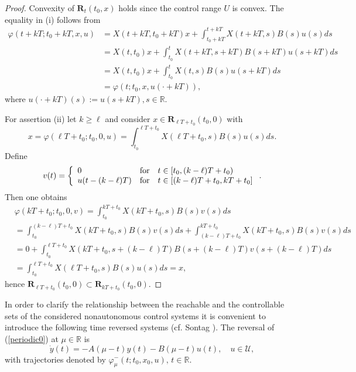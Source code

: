 \documentclass{siamltex}%
\begin{document}
\begin{proof}
Convexity of $\mathbf{R}_{t}(t_{0},x)$ holds since the control range $U$ is
convex. The equality in (i) follows from
\begin{align*}
\varphi(t+kT;t_{0}+kT,x,u)  &  =X(t+kT,t_{0}+kT)x+\int_{t_{0}+kT}%
^{t+kT}X(t+kT,s)B(s)u(s)ds\\
&  =X(t,t_{0})x+\int_{t_{0}}^{t}X(t+kT,s+kT)B(s+kT)u(s+kT)ds\\
&  =X(t,t_{0})x+\int_{t_{0}}^{t}X(t,s)B(s)u(s+kT)ds\\
&  =\varphi(t;t_{0},x,u(\cdot+kT)),
\end{align*}
where $u(\cdot+kT)(s):=u(s+kT),s\in\mathbb{R}$.

For assertion (ii) let $k\geq\ell$ and consider $x\in\mathbf{R}_{\ell T+t_{0}%
}(t_{0},0)$ with%
\[
x=\varphi(\ell T+t_{0};t_{0},0,u)=\int_{t_{0}}^{\ell T+t_{0}}X(\ell
T+t_{0},s)B(s)u(s)ds.
\]
Define
\[
v(t)=\left\{
\begin{array}
[c]{lll}%
0 & \text{for} & t\in\lbrack t_{0},(k-\ell)T+t_{0})\\
u(t-(k-\ell)T) & \text{for} & t\in\lbrack(k-\ell)T+t_{0},kT+t_{0}]
\end{array}
\right.  .
\]
Then one obtains
\begin{align*}
&  \varphi(kT+t_{0};t_{0},0,v)=\int_{t_{0}}^{kT+t_{0}}X(kT+t_{0}%
,s)B(s)v(s)ds\\
&  =\int_{t_{0}}^{(k-\ell)T+t_{0}}X(kT+t_{0},s)B(s)v(s)ds+\int_{(k-\ell
)T+t_{0}}^{kT+t_{0}}X(kT+t_{0},s)B(s)v(s)ds\\
&  =0+\int_{t_{0}}^{\ell T+t_{0}}X(kT+t_{0},s+(k-\ell)T)B(s+(k-\ell
)T)v(s+(k-\ell)T)ds\\
&  =\int_{t_{0}}^{\ell T+t_{0}}X(\ell T+t_{0},s)B(s)u(s)ds=x,
\end{align*}
hence $\mathbf{R}_{\ell T+t_{0}}(t_{0},0)\subset\mathbf{R}_{kT+t_{0}}%
(t_{0},0)$.
\end{proof}

In order to clarify the relationship between the reachable and the
controllable sets of the considered nonautonomous control systems it is
convenient to introduce the following time reversed systems (cf. Sontag
\cite[Definition 2.6.7 and Lemma 2.6.8]{Son98}). The reversal of
(\ref{periodic0}) at $\mu\in\mathbb{R}$ is
\begin{equation}
\dot{y}(t)=-A(\mu-t)y(t)-B(\mu-t)u(t),\quad u\in\mathcal{U}, \label{reversed}%
\end{equation}
with trajectories denoted by $\varphi_{\mu}^{-}(t;t_{0},x_{0},u),\,t\in
\mathbb{R}$.
\end{document}
